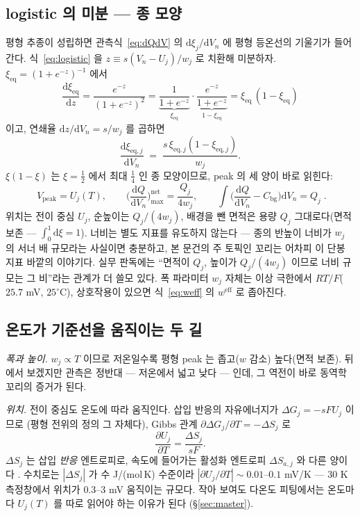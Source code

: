 \documentclass[11pt,a4paper]{article}
\newcommand{\dd}{\mathrm{d}}
\newcommand{\eff}{\mathrm{eff}}
\newcommand{\eq}{\mathrm{eq}}
\newcommand{\bg}{\mathrm{bg}}
\newcommand{\peak}{\mathrm{peak}}
\begin{document}
\subsection{logistic 의 미분 — 종 모양}
평형 추종이 성립하면 관측식~\eqref{eq:dQdV} 의 $\dd\xi_j/\dd V_n$ 에 평형 등온선의 기울기가 들어간다.
식~\eqref{eq:logistic} 을 $z\equiv s(V_n-U_j)/w_j$ 로 치환해 미분하자. $\xi_{\eq}=(1+e^{-z})^{-1}$
에서
\begin{equation}
\frac{\dd\xi_{\eq}}{\dd z}
=\frac{e^{-z}}{(1+e^{-z})^{2}}
=\underbrace{\frac{1}{1+e^{-z}}}_{\xi_{\eq}}\cdot
\underbrace{\frac{e^{-z}}{1+e^{-z}}}_{1-\xi_{\eq}}
=\xi_{\eq}\,(1-\xi_{\eq})
\label{eq:belliden}
\end{equation}
이고, 연쇄율 $\dd z/\dd V_n=s/w_j$ 를 곱하면
\begin{equation}
\frac{\dd\xi_{\eq,j}}{\dd V_n}\;=\;\frac{s\,\xi_{\eq,j}(1-\xi_{\eq,j})}{w_j}.
\label{eq:dxidV}
\end{equation}
$\xi(1-\xi)$ 는 $\xi=\tfrac12$ 에서 최대 $\tfrac14$ 인 종 모양이므로, peak 의 세 양이 바로 읽힌다:
\begin{equation}
\boxed{\;V_\peak=U_j(T),\qquad
\Big(\frac{\dd Q}{\dd V_n}\Big)^{\text{net}}_{\max}=\frac{Q_j}{4w_j},\qquad
\int\Big(\frac{\dd Q}{\dd V_n}-C_\bg\Big)\dd V_n=Q_j\;.}
\label{eq:eqpeak}
\end{equation}
위치는 전이 중심 $U_j$, 순높이는 $Q_j/(4w_j)$, 배경을 뺀 면적은 용량 $Q_j$ 그대로다(면적 보존 —
$\int_0^1\dd\xi=1$). 너비는 별도 지표를 유도하지 않는다 — 종의 반높이 너비가 $w_j$ 의 서너 배 규모라는
사실이면 충분하고, 본 문건의 주 토픽인 꼬리는 어차피 이 단봉 지표 바깥의 이야기다. 실무 판독에는 ``면적이
$Q_j$, 높이가 $Q_j/(4w_j)$ 이므로 너비 규모는 그 비''라는 관계가 더 쓸모 있다. 폭 파라미터 $w_j$ 자체는
이상 극한에서 $RT/F$($25.7$ mV, $25^\circ$C), 상호작용이 있으면 식~\eqref{eq:weff} 의 $w^{\eff}$ 로
좁아진다.

\subsection{온도가 기준선을 움직이는 두 길}
\emph{폭과 높이.} $w_j\propto T$ 이므로 저온일수록 평형 peak 는 좁고($w$ 감소) 높다(면적 보존). 뒤에서
보겠지만 관측은 정반대 — 저온에서 넓고 낮다 — 인데, 그 역전이 바로 동역학 꼬리의 증거가 된다.

\emph{위치.} 전이 중심도 온도에 따라 움직인다. 삽입 반응의 자유에너지가 $\Delta G_j=-sFU_j$ 이므로
(평형 전위의 정의 그 자체다), Gibbs 관계 $\partial\Delta G_j/\partial T=-\Delta S_j$ 로
\begin{equation}
\frac{\partial U_j}{\partial T}=\frac{\Delta S_j}{sF}.
\label{eq:dUdT}
\end{equation}
$\Delta S_j$ 는 삽입 \emph{반응} 엔트로피로, 속도에 들어가는 활성화 엔트로피 $\Delta S_{a,j}$ 와 다른
양이다 \cite{reynier2004}. 수치로는 $|\Delta S_j|$ 가 수 J/(mol\,K) 수준이라
$|\partial U_j/\partial T|\sim0.01$--$0.1$ mV/K — $30$ K 측정창에서 위치가 $0.3$--$3$ mV 움직이는
규모다. 작아 보여도 다온도 피팅에서는 온도마다 $U_j(T)$ 를 따로 읽어야 하는 이유가 된다
(\S\ref{sec:master}).
\end{document}
